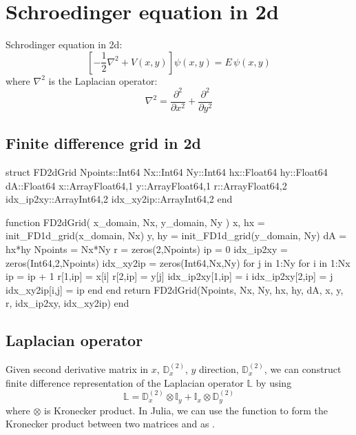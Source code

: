 \chapter{Schroedinger equation in 2d}

Schrodinger equation in 2d:
\begin{equation}
\left[ -\frac{1}{2}\nabla^2 + V(x,y) \right] \psi(x,y) = E\,\psi(x,y)
\end{equation}
%
where $\nabla^2$ is the Laplacian operator:
\begin{equation}
\nabla^2 = \frac{\partial^2}{\partial x^2} + \frac{\partial^2}{\partial y^2}
\end{equation}


\section{Finite difference grid in 2d}

\begin{juliacode}
struct FD2dGrid
    Npoints::Int64
    Nx::Int64
    Ny::Int64
    hx::Float64
    hy::Float64
    dA::Float64
    x::Array{Float64,1}
    y::Array{Float64,1}
    r::Array{Float64,2}
    idx_ip2xy::Array{Int64,2}
    idx_xy2ip::Array{Int64,2}
end
\end{juliacode}


\begin{juliacode}
function FD2dGrid( x_domain, Nx, y_domain, Ny )
    x, hx = init_FD1d_grid(x_domain, Nx)
    y, hy = init_FD1d_grid(y_domain, Ny)
    dA = hx*hy
    Npoints = Nx*Ny
    r = zeros(2,Npoints)
    ip = 0
    idx_ip2xy = zeros(Int64,2,Npoints)
    idx_xy2ip = zeros(Int64,Nx,Ny)
    for j in 1:Ny
        for i in 1:Nx
            ip = ip + 1
            r[1,ip] = x[i]
            r[2,ip] = y[j]
            idx_ip2xy[1,ip] = i
            idx_ip2xy[2,ip] = j
            idx_xy2ip[i,j] = ip
        end
    end
    return FD2dGrid(Npoints, Nx, Ny, hx, hy, dA, x, y, r, idx_ip2xy, idx_xy2ip)
end
\end{juliacode}

\section{Laplacian operator}

Given second derivative matrix in $x$, $\mathbb{D}^{(2)}_{x}$,
$y$ direction, $\mathbb{D}^{(2)}_{x}$,
we can construct finite difference representation of the Laplacian operator
$\mathbb{L}$ by using
%
\begin{equation}
\mathbb{L} = \mathbb{D}^{(2)}_{x} \otimes \mathbb{I}_{y} +
\mathbb{I}_{x} \otimes \mathbb{D}^{(2)}_{y}
\end{equation}
%
where $\otimes$ is Kronecker product.
In Julia, we can use the function  to form the Kronecker product
between two matrices  and  as .

